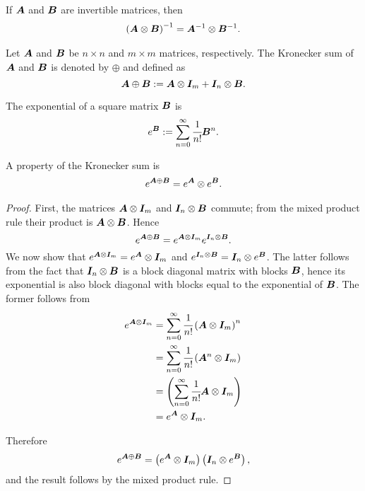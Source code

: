 If \(\boldsymbol A\) and \(\boldsymbol{B}\) are invertible matrices, then 
\begin{align}\label{eqn:kron inverse}
	\left(\boldsymbol A\otimes \boldsymbol{B}\right)^{-1} = \boldsymbol A^{-1}\otimes \boldsymbol{B}^{-1}.
\end{align}

Let \(\boldsymbol A\) and \(\boldsymbol{B}\) be \(n\times n\) and \(m\times m\) matrices, respectively. The Kronecker sum of \(\boldsymbol A\) and \(\boldsymbol{B}\) is denoted by \(\oplus\) and defined as 
\[\boldsymbol A\oplus \boldsymbol{B} := \boldsymbol A\otimes \boldsymbol{I}_{m} + \boldsymbol{I}_{n}\otimes \boldsymbol{B}.\]

The exponential of a square matrix \(\boldsymbol B\) is \[e^{\boldsymbol B} := \sum_{n=0}^\infty \cfrac{1}{n!}\boldsymbol B^n.\]

A property of the Kronecker sum is 
\begin{align}\label{eqn:kron exp}
	e^{\boldsymbol A\oplus \boldsymbol{B}}= e^{\boldsymbol A}\otimes e^{\boldsymbol{B}}.
\end{align}
\begin{proof}
	First, the matrices \(\boldsymbol A\otimes \boldsymbol{I}_m\) and \(\boldsymbol{I}_n\otimes \boldsymbol{B}\) commute; from the mixed product rule their product is \(\boldsymbol A\otimes \boldsymbol{B}\). Hence 
	\[e^{\boldsymbol A\oplus \boldsymbol{B}} = e^{\boldsymbol A\otimes \boldsymbol{I}_m}e^{\boldsymbol{I}_n\otimes \boldsymbol{B}}.\]
	We now show that \(e^{\boldsymbol A\otimes \boldsymbol{I}_m} = e^{\boldsymbol A}\otimes \boldsymbol{I}_m\) and \(e^{\boldsymbol{I}_n\otimes \boldsymbol{B}}=\boldsymbol{I}_n\otimes e^{\boldsymbol{B}}\). The latter follows from the fact that \(\boldsymbol{I}_n\otimes \boldsymbol{B}\) is a block diagonal matrix with blocks \(\boldsymbol{B}\), hence its exponential is also block diagonal with blocks equal to the exponential of \(\boldsymbol{B}\). The former follows from 
	\begin{align}
	e^{\boldsymbol A\otimes \boldsymbol{I}_m} &= \sum_{n=0}^\infty \cfrac{1}{n!}\left(\boldsymbol A\otimes \boldsymbol{I}_m\right)^n \nonumber
	\\&= \sum_{n=0}^\infty \cfrac{1}{n!}\left(\boldsymbol A^n\otimes \boldsymbol{I}_m\right) \nonumber
	\\&=\left(\sum_{n=0}^\infty \cfrac{1}{n!}\boldsymbol A\otimes \boldsymbol{I}_m\right) \nonumber
	\\&=e^{\boldsymbol A}\otimes \boldsymbol{I}_m.\label{eqn:09ksdjgah}
	\end{align}
	
	Therefore 
	\[e^{\boldsymbol A\oplus \boldsymbol{B}} = \left(e^{\boldsymbol A}\otimes \boldsymbol{I}_m\right)\left(\boldsymbol{I}_n\otimes e^{\boldsymbol{B}}\right),\]
	and the result follows by the mixed product rule. 
\end{proof}

